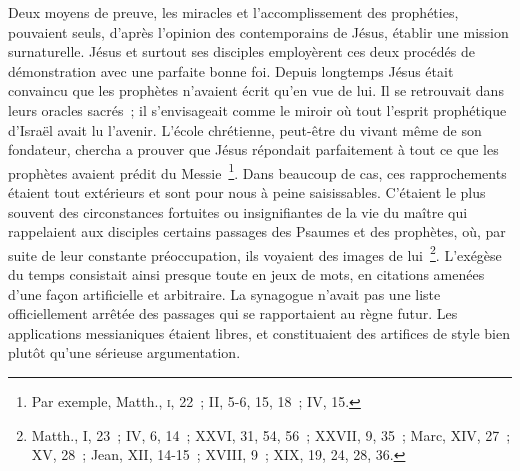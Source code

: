 \documentclass[french,twoside]{book} %
\newcommand\chaptercont{} %
\begin{document}
\chaptercont
\noindent Deux moyens de preuve, les miracles et l’accomplissement des prophéties, pouvaient seuls, d’après l’opinion des contemporains de Jésus, établir une mission surnaturelle. Jésus et surtout ses disciples employèrent ces deux procédés de démonstration avec une parfaite bonne foi. Depuis longtemps Jésus était convaincu que les prophètes n’avaient écrit qu’en vue de lui. Il se retrouvait dans leurs oracles sacrés ; il s’envisageait comme le miroir où tout l’esprit prophétique d’Israël avait lu l’avenir. L’école chrétienne, peut-être du vivant même de son fondateur, chercha a prouver que Jésus répondait parfaitement à tout ce que les prophètes avaient prédit du Messie \footnote{ Par exemple, Matth., \textsc{i}, 22 ; II, 5-6, 15, 18 ; IV, 15.}. Dans beaucoup de cas, ces rapprochements étaient tout extérieurs et sont pour nous à peine saisissables. C’étaient le plus souvent des circonstances fortuites ou insignifiantes de la vie du maître qui rappelaient aux disciples certains passages des Psaumes et des prophètes, où, par suite de leur constante préoccupation, ils voyaient des images de lui \footnote{Matth., I, 23 ; IV, 6, 14 ; XXVI, 31, 54, 56 ; XXVII, 9, 35 ; Marc, XIV, 27 ; XV, 28 ; Jean, XII, 14-15 ; XVIII, 9 ; XIX, 19, 24, 28, 36.}. L’exégèse du temps consistait ainsi presque toute en jeux de mots, en citations amenées d’une façon artificielle et arbitraire. La synagogue n’avait pas une liste officiellement arrêtée des passages qui se rapportaient au règne futur. Les applications messianiques étaient libres, et constituaient des artifices de style bien plutôt qu’une sérieuse argumentation.\par
\end{document}
